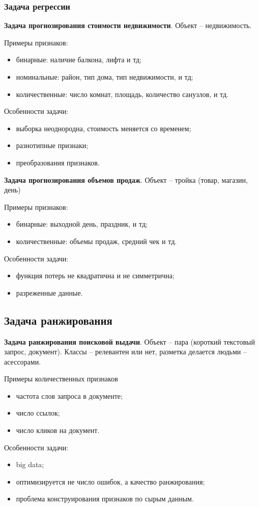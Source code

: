 \begin{multicols}{2}
    \subsubsection*{Задача регрессии}
    \textbf{Задача прогнозирования стоимости недвижимости}. Объект -- недвижимость. 
    \par
    Примеры признаков: 
    \begin{itemize}
      \item бинарные: наличие балкона, лифта и тд;
      \item номинальные: район, тип дома, тип недвижимости, и тд;
      \item количественные: число комнат, площадь, количество санузлов, и тд.
    \end{itemize}
    Особенности задачи:
    \begin{itemize}
      \item выборка неоднородна, стоимость меняется со временем;
      \item разнотипные признаки;
      \item преобразования признаков.
    \end{itemize}
    \textbf{Задача прогнозирования объемов продаж}. Объект -- тройка (товар, магазин, день)
    \par
    Примеры признаков:
    \begin{itemize}
      \item бинарные: выходной день, праздник, и тд;
      \item количественные: объемы продаж, средний чек и тд.
    \end{itemize}
    Особенности задачи:
    \begin{itemize}
      \item функция потерь не квадратична и не симметрична;
      \item разреженные данные.
    \end{itemize}
    \subsection*{Задача ранжирования}
    \textbf{Задача ранжирования поисковой выдачи}. Объект -- пара (короткий текстовый запрос, документ). Классы -- релевантен или нет, разметка делается людьми -- асессорами.
    \par
    Примеры количественных признаков
    \begin{itemize}
      \item частота слов запроса в документе;
      \item число ссылок;
      \item число кликов на документ.
    \end{itemize}
    Особенности задачи:
    \begin{itemize}
      \item big data;
      \item оптимизируется не число ошибок, а качество ранжирования;
      \item проблема конструирования признаков по сырым данным.
    \end{itemize}

\end{multicols}
